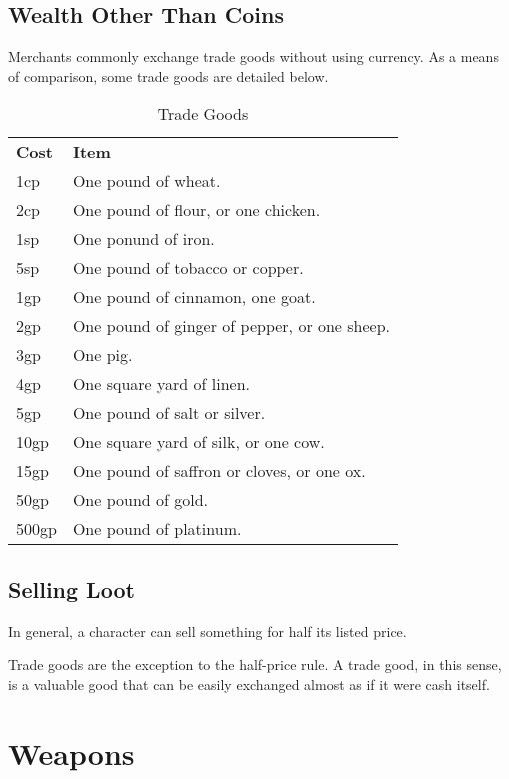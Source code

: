 \subsection{Wealth Other Than Coins}

Merchants commonly exchange trade goods without using currency. As a means of comparison, 
some trade goods are detailed below.

\begin{table}[htb]
\caption{Trade Goods}
\centering
\begin{tabular}{l l}
\textbf{Cost} & \textbf{Item} \\
1cp & One pound of wheat.\\
2cp & One pound of flour, or one chicken.\\
1sp & One ponund of iron.\\
5sp & One pound of tobacco or copper.\\
1gp & One pound of cinnamon, one goat.\\
2gp & One pound of ginger of pepper, or one sheep.\\
3gp & One pig.\\
4gp & One square yard of linen.\\
5gp & One pound of salt or silver.\\
10gp & One square yard of silk, or one cow.\\
15gp & One pound of saffron or cloves, or one ox.\\
50gp & One pound of gold.\\
500gp & One pound of platinum.\\
\end{tabular}
\end{table}

\subsection{Selling Loot}

In general, a character can sell something for half its listed price.

Trade goods are the exception to the half-price rule. A trade good, in this sense, 
is a valuable good that can be easily exchanged almost as if it were cash itself.

\section{Weapons}

